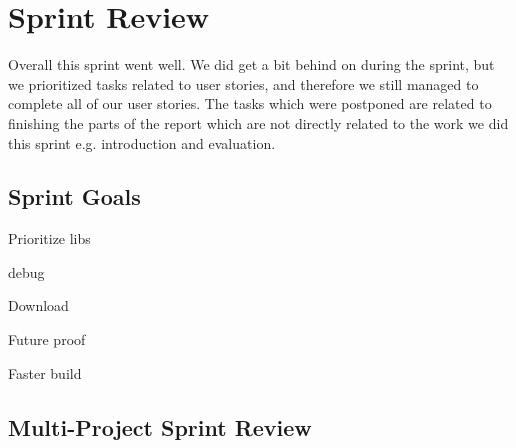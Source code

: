 \chapter{Sprint Review}\label{chap:sprint4_end}
Overall this sprint went well. We did get a bit behind on during the sprint, but we prioritized tasks related to user stories, and therefore we still managed to complete all of our user stories. The tasks which were postponed are related to finishing the parts of the report which are not directly related to the work we did this sprint e.g. introduction and evaluation. 
\section{Sprint Goals}\label{sec:s4_goals}
Prioritize libs

debug

Download

Future proof

Faster build
\section{Multi-Project Sprint Review}\label{sec:s4_multiprj_review}